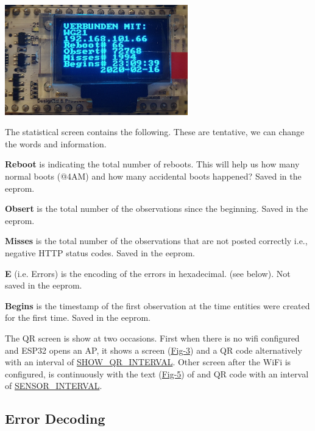 \begin{DoxyItemize}
\begin{DoxyEnumerate}
\begin{DoxyImage}
\includegraphics[width=300px]{screen2}
\end{DoxyImage}
 The statistical screen contains the following. These are tentative, we can change the words and information.
\begin{DoxyEnumerate}
\item {\bfseries{Reboot}} is indicating the total number of reboots. This will help us how many normal boots (@4AM) and how many accidental boots happened? Saved in the eeprom.
\item {\bfseries{Obsert}} is the total number of the observations since the beginning. Saved in the eeprom.
\item {\bfseries{Misses}} is the total number of the observations that are not posted correctly i.\+e., negative H\+T\+TP status codes. Saved in the eeprom.
\item {\bfseries{E}} (i.\+e. Errors) is the encoding of the errors in hexadecimal. (see below). Not saved in the eeprom.
\item {\bfseries{Begins}} is the timestamp of the first observation at the time entities were created for the first time. Saved in the eeprom.~\newline

\end{DoxyEnumerate}
\item The QR screen is show at two occasions. First when there is no wifi configured and E\+S\+P32 opens an AP, it shows a screen (\mbox{\hyperlink{index_Fig-3}{Fig-\/3}}) and a QR code alternatively with an interval of \mbox{\hyperlink{my_auto_connect_8h_aaba24da06a6518ece5c17ddc6f952e22}{S\+H\+O\+W\+\_\+\+Q\+R\+\_\+\+I\+N\+T\+E\+R\+V\+AL}}. Other screen after the Wi\+Fi is configured, is continuously with the text (\mbox{\hyperlink{index_Fig-5}{Fig-\/5}}) of and QR code with an interval of \mbox{\hyperlink{main_8h_a71a7a65f7dd7e8f3ea14942213cd8217}{S\+E\+N\+S\+O\+R\+\_\+\+I\+N\+T\+E\+R\+V\+AL}}.
\end{DoxyEnumerate}
\end{DoxyItemize}\hypertarget{index_errorenc}{}\subsection{Error Decoding}\label{index_errorenc}
